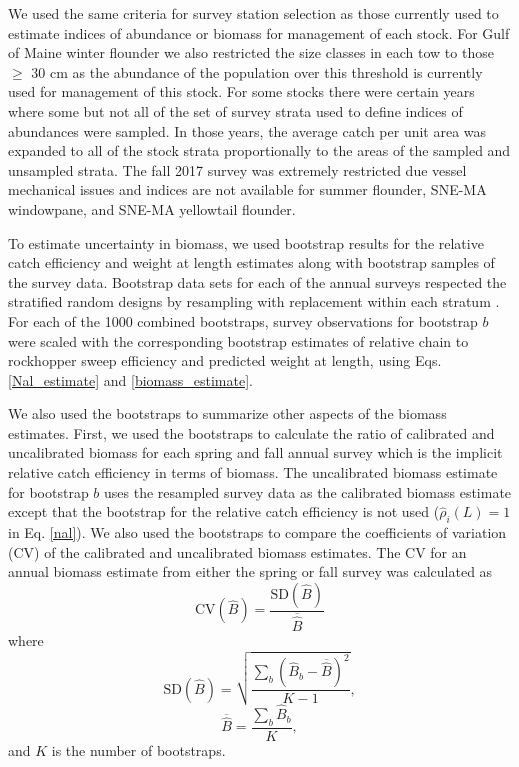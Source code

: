 \documentclass[]{article}
\begin{document}
We used the same criteria for survey station selection as those
currently used to estimate indices of abundance or biomass for
management of each stock. For Gulf of Maine winter flounder we also
restricted the size classes in each tow to those \(\geq\) 30 cm as the
abundance of the population over this threshold is currently used for
management of this stock. For some stocks there were certain years where
some but not all of the set of survey strata used to define indices of
abundances were sampled. In those years, the average catch per unit area
was expanded to all of the stock strata proportionally to the areas of
the sampled and unsampled strata. The fall 2017 survey was extremely
restricted due vessel mechanical issues and indices are not available
for summer flounder, SNE-MA windowpane, and SNE-MA yellowtail flounder.

To estimate uncertainty in biomass, we used bootstrap results for the
relative catch efficiency and weight at length estimates along with
bootstrap samples of the survey data. Bootstrap data sets for each of
the annual surveys respected the stratified random designs by resampling
with replacement within each stratum \citep{smith97}. For each of the
1000 combined bootstraps, survey observations for bootstrap \(b\) were
scaled with the corresponding bootstrap estimates of relative chain to
rockhopper sweep efficiency and predicted weight at length, using Eqs.
\ref{Nal_estimate} and \ref{biomass_estimate}.

We also used the bootstraps to summarize other aspects of the biomass
estimates. First, we used the bootstraps to calculate the ratio of
calibrated and uncalibrated biomass for each spring and fall annual
survey which is the implicit relative catch efficiency in terms of
biomass. The uncalibrated biomass estimate for bootstrap \(b\) uses the
resampled survey data as the calibrated biomass estimate except that the
bootstrap for the relative catch efficiency is not used
(\(\widehat \rho_i\left(L\right) = 1\) in Eq. \ref{nal}). We also used
the bootstraps to compare the coefficients of variation (CV) of the
calibrated and uncalibrated biomass estimates. The CV for an annual
biomass estimate from either the spring or fall survey was calculated as
\[
\text{CV}\left(\widehat B\right) = \frac{\text{SD}\left(\widehat B\right)}{\overline{\widehat B}}
\] where \[
\text{SD}\left(\widehat B\right) = \sqrt{\frac{\sum_b \left(\widehat B_b - \overline{\widehat B}\right)^2}{K-1}},
\] \[
\overline{\widehat B} = \frac{\sum_b \widehat B_b}{K},
\] and \(K\) is the number of bootstraps.
\end{document}
